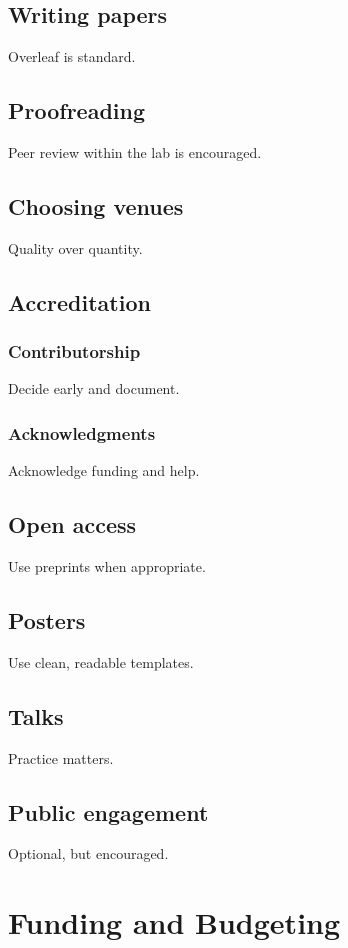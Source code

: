\documentclass[11pt]{article}
\begin{document}
\subsection{Writing papers}
Overleaf is standard.

\subsection{Proofreading}
Peer review within the lab is encouraged.

\subsection{Choosing venues}
Quality over quantity.

\subsection{Accreditation}

\subsubsection{Contributorship}
Decide early and document.

\subsubsection{Acknowledgments}
Acknowledge funding and help.

\subsection{Open access}
Use preprints when appropriate.

\subsection{Posters}
Use clean, readable templates.

\subsection{Talks}
Practice matters.

\subsection{Public engagement}
Optional, but encouraged.

\section{Funding and Budgeting}
\end{document}
